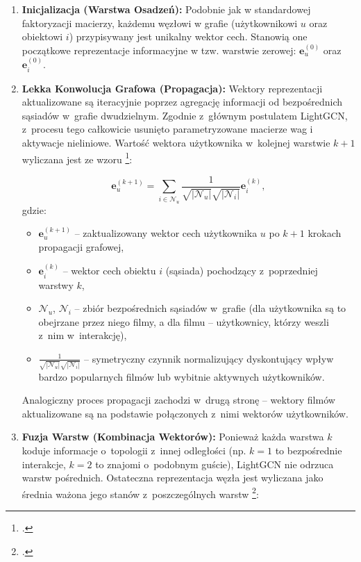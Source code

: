 \begin{enumerate}
    \item \textbf{Inicjalizacja (Warstwa Osadzeń):} Podobnie jak w standardowej faktoryzacji macierzy, każdemu węzłowi w grafie (użytkownikowi $u$ oraz obiektowi $i$) przypisywany jest unikalny wektor cech. Stanowią one początkowe reprezentacje informacyjne w tzw. warstwie zerowej: $\mathbf{e}_u^{(0)}$ oraz $\mathbf{e}_i^{(0)}$.

    \item \textbf{Lekka Konwolucja Grafowa (Propagacja):} Wektory reprezentacji aktualizowane są iteracyjnie poprzez agregację informacji od bezpośrednich sąsiadów w~grafie dwudzielnym. Zgodnie z~głównym postulatem LightGCN, z~procesu tego całkowicie usunięto parametryzowane macierze wag i aktywacje nieliniowe. Wartość wektora użytkownika w~kolejnej warstwie $k+1$ wyliczana jest ze wzoru \footcite[3]{heLightGCNSimplifyingPowering2020}:

          \begin{equation}
              \mathbf{e}_u^{(k+1)} = \sum_{i \in \mathcal{N}_u} \frac{1}{\sqrt{|\mathcal{N}_u|} \sqrt{|\mathcal{N}_i|}} \mathbf{e}_i^{(k)},
              \label{eq:lightgcn_prop}
          \end{equation}
          gdzie:
          \begin{itemize}
              \item $\mathbf{e}_u^{(k+1)}$ -- zaktualizowany wektor cech użytkownika $u$ po $k+1$ krokach propagacji grafowej,
              \item $\mathbf{e}_i^{(k)}$ -- wektor cech obiektu $i$ (sąsiada) pochodzący z~poprzedniej warstwy $k$,
              \item $\mathcal{N}_u$, $\mathcal{N}_i$ -- zbiór bezpośrednich sąsiadów w~grafie (dla użytkownika są to obejrzane przez niego filmy, a dla filmu -- użytkownicy, którzy weszli z~nim w~interakcję),
              \item $\frac{1}{\sqrt{|\mathcal{N}_u|} \sqrt{|\mathcal{N}_i|}}$ -- symetryczny czynnik normalizujący dyskontujący wpływ bardzo popularnych filmów lub wybitnie aktywnych użytkowników.
          \end{itemize}
          Analogiczny proces propagacji zachodzi w~drugą stronę -- wektory filmów aktualizowane są na podstawie połączonych z~nimi wektorów użytkowników.

    \item \textbf{Fuzja Warstw (Kombinacja Wektorów):} Ponieważ każda warstwa $k$ koduje informacje o~topologii z~innej odległości (np. $k=1$ to bezpośrednie interakcje, $k=2$ to znajomi o~podobnym guście), LightGCN nie odrzuca warstw pośrednich. Ostateczna reprezentacja węzła jest wyliczana jako średnia ważona jego stanów z~poszczególnych warstw \footcite[4]{heLightGCNSimplifyingPowering2020}:


\end{enumerate}
